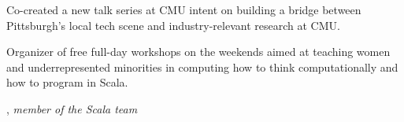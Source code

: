 \documentclass[9pt]{article}
\begin{document}
\bigskip
{}


\newline\noindent Co-created a new talk series at CMU intent on building a bridge between
\newline\noindent Pittsburgh's local tech scene and industry-relevant research at CMU.

\medskip

\newline\noindent Organizer of free full-day workshops on the weekends aimed at teaching women
\newline\noindent and underrepresented minorities in computing how to think computationally and
\newline\noindent how to program in Scala.
\smallskip
\newline{}
\bigskip

\medskip
{}

\vspace{0.01in}
, {\em member of the Scala team} 
\end{document}
